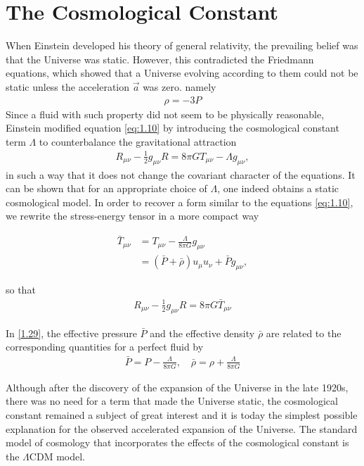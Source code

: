 \section{The Cosmological Constant}
\hspace{0.5cm}When Einstein developed his theory of general relativity, the prevailing belief was that the Universe was static. However, this contradicted the Friedmann equations, which showed that a Universe
evolving according to them could not be static unless the acceleration  $\vec{a}$ was zero. namely
\begin{align}
   \rho=-3 P \label{1.26}
\end{align}
Since a fluid with such property did not seem to be physically reasonable, Einstein modified equation \ref{eq:1.10} by introducing the cosmological constant term $\Lambda$ to counterbalance the gravitational attraction
\begin{align}
    R_{\mu \nu}-\frac{1}{2} g_{\mu \nu} R=8 \pi G T_{\mu \nu}-\Lambda g_{\mu \nu},\label{1.27}
\end{align}
 in such a way that it does not change the covariant character of the equations. It can be shown that for an appropriate choice of $\Lambda$, one indeed obtains a static cosmological model.
In order to recover a form similar to the equations \ref{eq:1.10}, we rewrite the stress-energy tensor in a more compact way

\begin{align}
    \bar{T}_{\mu \nu} & =T_{\mu \nu}-\frac{\Lambda}{8 \pi G} g_{\mu \nu} \\ & =(\bar{P}+\bar{\rho}) u_\mu u_\nu+\bar{P} g_{\mu \nu}, \label{1.29}
\end{align}

so that
\begin{align}
    R_{\mu \nu}-\frac{1}{2} g_{\mu \nu} R=8 \pi G \bar{T}_{\mu \nu}\label{1.30}
\end{align}


In \ref{1.29}, the effective pressure $\bar{P}$ and the effective density $\bar{\rho}$ are related to the corresponding quantities for a perfect fluid by
\begin{align}
    \bar{P}=P-\frac{\Lambda}{8 \pi G}, \quad \bar{\rho}=\rho+\frac{\Lambda}{8 \pi G}\label{1.31}
\end{align}

Although after the discovery of the expansion of the Universe in the late 1920s, there was no need for a term that made the Universe static, the cosmological constant remained a subject of great interest and it is today the simplest possible explanation for the observed accelerated expansion of the Universe. The standard model of cosmology that incorporates the effects of the cosmological constant is the $\Lambda$CDM model.

